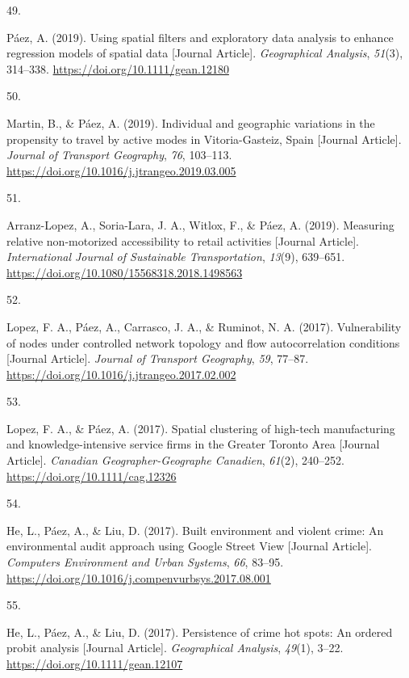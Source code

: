 \documentclass[11pt,a4paper,]{awesome-cv}
\newlength{\cslhangindent}
\newlength{\csllabelwidth}
\newenvironment{CSLReferences}[2] %
 {\begin{list}{}{%
  \setlength{\itemindent}{0pt}
  \setlength{\leftmargin}{0pt}
  \setlength{\parsep}{0pt}
  \ifodd #1
   \setlength{\leftmargin}{\cslhangindent}
   \setlength{\itemindent}{-1\cslhangindent}
  \fi
  \setlength{\itemsep}{#2\baselineskip}}}
 {\end{list}}
\newcommand{\CSLLeftMargin}[1]{\parbox[t]{\csllabelwidth}{\strut#1\strut}}
\newcommand{\CSLRightInline}[1]{\parbox[t]{\linewidth - \csllabelwidth}{\strut#1\strut}}
\begin{document}
\begin{CSLReferences}{0}{0}
\CSLLeftMargin{49. }%
\CSLRightInline{Páez, A. (2019). Using spatial filters and exploratory
data analysis to enhance regression models of spatial data {[}Journal
Article{]}. \emph{Geographical Analysis}, \emph{51}(3), 314--338.
\url{https://doi.org/10.1111/gean.12180}}

\CSLLeftMargin{50. }%
\CSLRightInline{Martin, B., \& Páez, A. (2019). Individual and
geographic variations in the propensity to travel by active modes in
Vitoria-Gasteiz, Spain {[}Journal Article{]}. \emph{Journal of Transport
Geography}, \emph{76}, 103--113.
\url{https://doi.org/10.1016/j.jtrangeo.2019.03.005}}

\CSLLeftMargin{51. }%
\CSLRightInline{Arranz-Lopez, A., Soria-Lara, J. A., Witlox, F., \&
Páez, A. (2019). Measuring relative non-motorized accessibility to
retail activities {[}Journal Article{]}. \emph{International Journal of
Sustainable Transportation}, \emph{13}(9), 639--651.
\url{https://doi.org/10.1080/15568318.2018.1498563}}

\CSLLeftMargin{52. }%
\CSLRightInline{Lopez, F. A., Páez, A., Carrasco, J. A., \& Ruminot, N.
A. (2017). Vulnerability of nodes under controlled network topology and
flow autocorrelation conditions {[}Journal Article{]}. \emph{Journal of
Transport Geography}, \emph{59}, 77--87.
\url{https://doi.org/10.1016/j.jtrangeo.2017.02.002}}

\CSLLeftMargin{53. }%
\CSLRightInline{Lopez, F. A., \& Páez, A. (2017). Spatial clustering of
high-tech manufacturing and knowledge-intensive service firms in the
Greater Toronto Area {[}Journal Article{]}. \emph{Canadian
Geographer-Geographe Canadien}, \emph{61}(2), 240--252.
\url{https://doi.org/10.1111/cag.12326}}

\CSLLeftMargin{54. }%
\CSLRightInline{He, L., Páez, A., \& Liu, D. (2017). Built environment
and violent crime: An environmental audit approach using Google Street
View {[}Journal Article{]}. \emph{Computers Environment and Urban
Systems}, \emph{66}, 83--95.
\url{https://doi.org/10.1016/j.compenvurbsys.2017.08.001}}

\CSLLeftMargin{55. }%
\CSLRightInline{He, L., Páez, A., \& Liu, D. (2017). Persistence of
crime hot spots: An ordered probit analysis {[}Journal Article{]}.
\emph{Geographical Analysis}, \emph{49}(1), 3--22.
\url{https://doi.org/10.1111/gean.12107}}


\end{CSLReferences}
\end{document}
